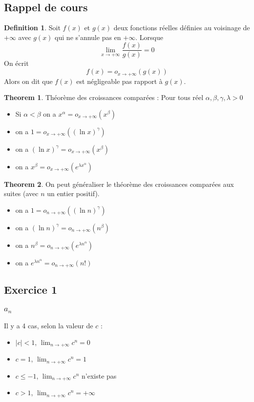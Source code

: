 \documentclass[]{book}
\theoremstyle{definition}
\newtheorem{defn}{Definition}
\newtheorem{thm}{Theorem}
\begin{document}
\subsection*{Rappel de cours}

\begin{defn}
Soit $f(x)$ et $g(x)$ deux fonctions r\'eelles d\'efinies au voisinage de $+\infty$ avec $g(x)$ qui ne s'annule pas en $+\infty$. Lorsque 	
$$\lim_{x \to +\infty}\frac{f(x)}{g(x)} = 0$$
On \'ecrit
$$f(x) = o_{x \to +\infty}(g(x))$$
Alors on dit que $f(x)$ est n\'egligeable pas rapport \`a $g(x)$.\\
\end{defn}


\begin{thm}
Th\'eor\`eme des croissances compar\'ees : Pour tous r\'eel $\alpha,\beta, \gamma, \lambda >0$
\begin{itemize}
\item Si $\alpha < \beta$ on a $x^{\alpha} = o_{x \to +\infty}(x^{\beta})$
\item on a $1 = o_{x \to +\infty}((\ln x)^{\gamma})$
\item on a $(\ln x)^{\gamma} = o_{x \to +\infty}(x^{\beta})$
\item on a $x^{\beta} = o_{x \to +\infty}(e^{\lambda x^{\alpha}})$
\end{itemize}
\end{thm}


\begin{thm}
On peut g\'en\'eraliser le th\'eor\`eme des croissances compar\'ees aux suites (avec $n$ un entier positif).
\begin{itemize}
\item on a $1 = o_{n \to +\infty}((\ln n)^{\gamma})$
\item on a $(\ln n)^{\gamma} = o_{n \to +\infty}(n^{\beta})$
\item on a $n^{\beta} = o_{n \to +\infty}(e^{\lambda n^{\alpha}})$
\item on a $e^{\lambda n^{\alpha}} = o_{n \to +\infty}(n!)$
\end{itemize}
\end{thm}

\newpage
\subsection*{Exercice 1}
\subsubsection*{$a_n$}
Il y a 4 cas, selon la valeur de $c$ :
\begin{itemize}
\item $|c| < 1$, $\lim_{n \to +\infty}{c^n} =0$
\item $c = 1$, $\lim_{n \to +\infty}{c^n} = 1$
\item $c \leq -1$, $\lim_{n \to +\infty}{c^n}$ n'existe pas
\item $c > 1$, $\lim_{n \to +\infty}{c^n} = +\infty$
\end{itemize}
\end{document}
